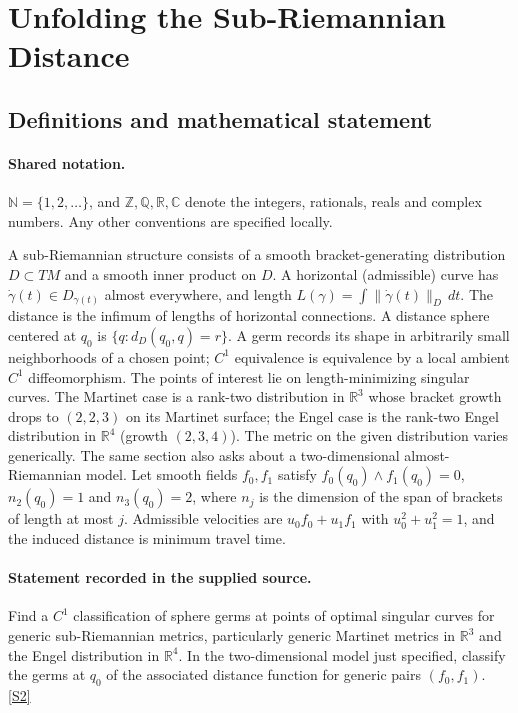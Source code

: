 \documentclass[11pt]{article}
\newcommand{\sref}[2]{\hyperlink{source:#1:#2}{[S#2]}}
\begin{document}
\section{Unfolding the Sub-Riemannian Distance}\label{statement}

\subsection{Definitions and mathematical statement}

\paragraph{Shared notation.}$\mathbb N=\{1,2,\ldots\}$, and $\mathbb Z,\mathbb Q,\mathbb R,\mathbb C$ denote the integers, rationals, reals and complex numbers. Any other conventions are specified locally.


A sub-Riemannian structure consists of a smooth bracket-generating distribution $D\subset TM$ and a smooth inner product on $D$. A horizontal (admissible) curve has $\dot\gamma(t)\in D_{\gamma(t)}$ almost everywhere, and length $L(\gamma)=\int\|\dot\gamma(t)\|_D\,dt$. The distance is the infimum of lengths of horizontal connections. A distance sphere centered at $q_0$ is $\{q:d_D(q_0,q)=r\}$. A germ records its shape in arbitrarily small neighborhoods of a chosen point; $C^1$ equivalence is equivalence by a local ambient $C^1$ diffeomorphism. The points of interest lie on length-minimizing singular curves. The Martinet case is a rank-two distribution in $\mathbb R^3$ whose bracket growth drops to $(2,2,3)$ on its Martinet surface; the Engel case is the rank-two Engel distribution in $\mathbb R^4$ (growth $(2,3,4)$). The metric on the given distribution varies generically.
The same section also asks about a two-dimensional almost-Riemannian model. Let smooth fields $f_0,f_1$ satisfy $f_0(q_0)\wedge f_1(q_0)=0$, $n_2(q_0)=1$ and $n_3(q_0)=2$, where $n_j$ is the dimension of the span of brackets of length at most $j$. Admissible velocities are $u_0f_0+u_1f_1$ with $u_0^2+u_1^2=1$, and the induced distance is minimum travel time.
\paragraph{Statement recorded in the supplied source.}
Find a $C^1$ classification of sphere germs at points of optimal singular curves for generic sub-Riemannian metrics, particularly generic Martinet metrics in $\mathbb R^3$ and the Engel distribution in $\mathbb R^4$. In the two-dimensional model just specified, classify the germs at $q_0$ of the associated distance function for generic pairs $(f_0,f_1)$. \sref{statement}{2}
\end{document}
